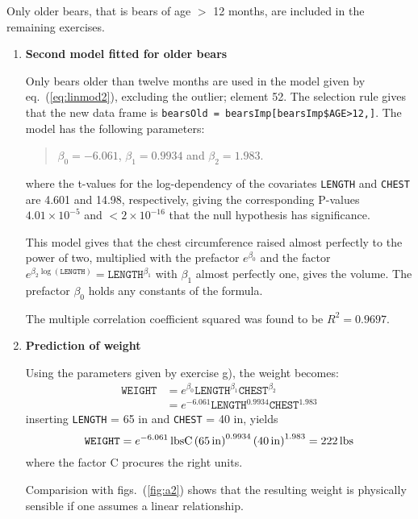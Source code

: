 \documentclass[a4paper,11pt]{article}
\begin{document}
Only older bears, that is bears of age $>$ 12 months, are included in the remaining exercises.

\begin{enumerate}[resume*]
    \item \textbf{Second model fitted for older bears}
        
        Only bears older than twelve months are used in the model given by eq.~(\ref{eq:linmod2}), excluding the outlier; element 52. The selection rule gives that the new data frame is \texttt{bearsOld = bearsImp[bearsImp\$AGE>12,]}. The model has the following parameters:
        \begin{quote}
            $\beta_0 = -6.061$, $\beta_1 = 0.9934$ and $\beta_2= 1.983$.
        \end{quote}
        where the t-values for the log-dependency of the covariates \texttt{LENGTH} and \texttt{CHEST} are 4.601 and 14.98, respectively, giving the corresponding P-values $4.01\times10^{-5}$ and $<2\times10^{-16}$ that the null hypothesis has significance.

        This model gives that the chest circumference raised almost perfectly to the power of two, multiplied with the prefactor $e^{\beta_0}$ and the factor $e^{\beta_2 \log(\mathtt{LENGTH})} = \mathtt{LENGTH}^{\beta_1}$ with $\beta_1$ almost perfectly one, gives the volume. The prefactor $\beta_0$ holds any constants of the formula.

        The multiple correlation coefficient squared was found to be $R^2 = 0.9697$. 
    
    \item \textbf{Prediction of weight}

        Using the parameters given by exercise g), the weight becomes:
        \begin{align*}
            \mathtt{WEIGHT} &= e^{\beta_0} \mathtt{LENGTH}^{\beta_1} \mathtt{CHEST}^{\beta_2} \\
            &= e^{-6.061} \mathtt{LENGTH}^{0.9934} \mathtt{CHEST}^{1.983}
        \end{align*}
        inserting \texttt{LENGTH} = 65 in and \texttt{CHEST} = 40 in, yields
        \[ \mathtt{WEIGHT} = e^{-6.061} {\rm \, lbs C} \left( 65 \,\rm in \right)^{0.9934} \left( 40\,\rm in \right)^{1.983} = 222 \,\rm lbs \] 
        where the factor C procures the right units. 

        Comparision with figs.~(\ref{fig:a2}) shows that the resulting weight is physically sensible if one assumes a linear relationship.
\end{enumerate}
\end{document}
